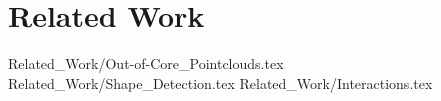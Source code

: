 \chapter {Related Work}
\label{chap:related_work}
 {Related_Work/Out-of-Core_Pointclouds.tex}
 {Related_Work/Shape_Detection.tex}
 {Related_Work/Interactions.tex}